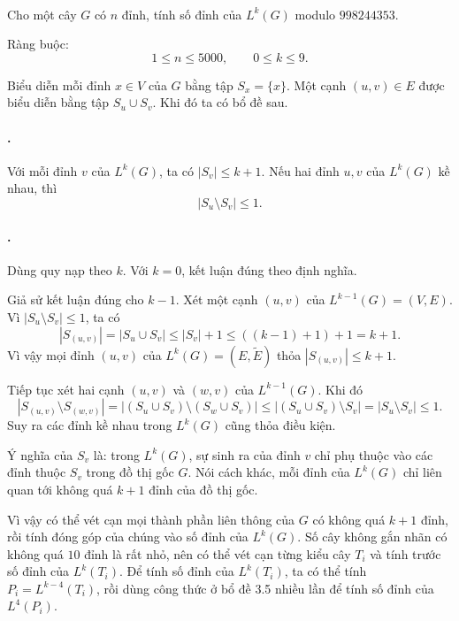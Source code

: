 \documentclass[11pt]{article}
\begin{document}
\paragraph{}
Cho một cây \(G\) có \(n\) đỉnh, tính số đỉnh của \(L^k(G)\) modulo
\(998244353\).

Ràng buộc:
\[
  1\le n\le 5000,\qquad 0\le k\le 9.
\]

Biểu diễn mỗi đỉnh \(x\in V\) của \(G\) bằng tập \(S_x=\{x\}\). Một cạnh
\((u,v)\in E\) được biểu diễn bằng tập \(S_u\cup S_v\). Khi đó ta có bổ đề sau.

\paragraph{.}
Với mỗi đỉnh \(v\) của \(L^k(G)\), ta có \(|S_v|\le k+1\). Nếu hai đỉnh
\(u,v\) của \(L^k(G)\) kề nhau, thì
\[
  |S_u\setminus S_v|\le 1.
\]

\paragraph{.}
Dùng quy nạp theo \(k\). Với \(k=0\), kết luận đúng theo định nghĩa.

Giả sử kết luận đúng cho \(k-1\). Xét một cạnh \((u,v)\) của
\(L^{k-1}(G)=(V,E)\). Vì \(|S_u\setminus S_v|\le 1\), ta có
\[
  |S_{(u,v)}|=|S_u\cup S_v|
  \le |S_v|+1\le ((k-1)+1)+1=k+1.
\]
Vì vậy mọi đỉnh \((u,v)\) của \(L^k(G)=(E,\widetilde E)\) thỏa
\(|S_{(u,v)}|\le k+1\).

Tiếp tục xét hai cạnh \((u,v)\) và \((w,v)\) của \(L^{k-1}(G)\). Khi đó
\[
  |S_{(u,v)}\setminus S_{(w,v)}|
  = |(S_u\cup S_v)\setminus(S_w\cup S_v)|
  \le |(S_u\cup S_v)\setminus S_v|
  = |S_u\setminus S_v|\le 1.
\]
Suy ra các đỉnh kề nhau trong \(L^k(G)\) cũng thỏa điều kiện.

Ý nghĩa của \(S_v\) là: trong \(L^k(G)\), sự sinh ra của đỉnh \(v\) chỉ phụ
thuộc vào các đỉnh thuộc \(S_v\) trong đồ thị gốc \(G\). Nói cách khác, mỗi
đỉnh của \(L^k(G)\) chỉ liên quan tới không quá \(k+1\) đỉnh của đồ thị gốc.

Vì vậy có thể vét cạn mọi thành phần liên thông của \(G\) có không quá \(k+1\)
đỉnh, rồi tính đóng góp của chúng vào số đỉnh của \(L^k(G)\). Số cây không gắn
nhãn có không quá \(10\) đỉnh là rất nhỏ, nên có thể vét cạn từng kiểu cây
\(T_i\) và tính trước số đỉnh của \(L^k(T_i)\). Để tính số đỉnh của
\(L^k(T_i)\), ta có thể tính \(P_i=L^{k-4}(T_i)\), rồi dùng công thức ở bổ đề
3.5 nhiều lần để tính số đỉnh của \(L^4(P_i)\).
\end{document}

